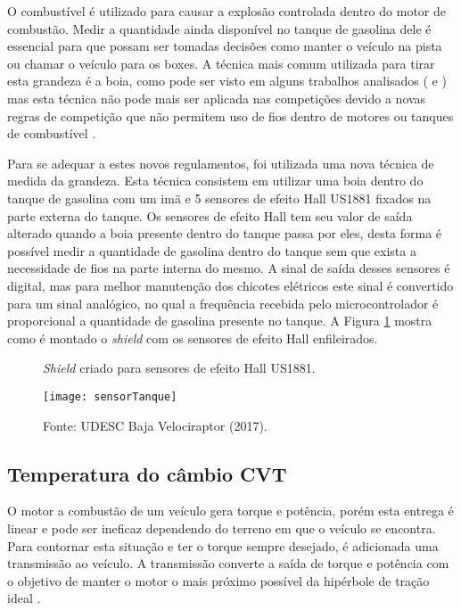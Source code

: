 O combustível é utilizado para causar a explosão controlada dentro do motor de combustão. Medir a quantidade ainda disponível no tanque de gasolina dele é essencial para que possam ser tomadas decisões como manter o veículo na pista ou chamar o veículo para os boxes. A técnica mais comum utilizada para tirar esta grandeza é a boia, como pode ser visto em alguns trabalhos analisados (\cite{Nunes2016} e \cite{projetoMiniBaja2006}) mas esta técnica não pode mais ser aplicada nas competições devido a novas regras de competição que não permitem uso de fios dentro de motores ou tanques de combustível \cite{regulamentobajasae}. 

Para se adequar a estes novos regulamentos, foi utilizada uma nova técnica de medida da grandeza. Esta técnica consistem em utilizar uma boia dentro do tanque de gasolina com um imã e 5 sensores de efeito Hall US1881 fixados na parte externa do tanque. Os sensores de efeito Hall tem seu valor de saída alterado quando a boia presente dentro do tanque passa por eles, desta forma é possível medir a quantidade de gasolina dentro do tanque sem que exista a necessidade de fios na parte interna do mesmo. A sinal de saída desses sensores é digital, mas para melhor manutenção dos chicotes elétricos este sinal é convertido para um sinal analógico, no qual a frequência recebida pelo microcontrolador é proporcional a quantidade de gasolina presente no tanque. A Figura \ref{fig:sensorTanque} mostra como é montado o \textit{shield} com os sensores de efeito Hall enfileirados.  

\begin{figure}[!htb]
	\centering
		\caption{\textit{Shield} criado para sensores de efeito Hall US1881.}
		\texttt{[image: sensorTanque]} 
		\caption*{Fonte: UDESC Baja Velociraptor (2017).}
		\label{fig:sensorTanque}
\end{figure} 


\subsection{Temperatura do câmbio CVT}

O motor a combustão de um veículo gera torque e potência, porém esta entrega é linear e pode ser ineficaz dependendo do terreno em que o veículo se encontra. Para contornar esta situação e ter o torque sempre desejado, é adicionada uma transmissão ao veículo. A transmissão converte a saída de torque e potência com o objetivo de manter o motor o mais próximo possível da hipérbole de tração ideal \cite{Naunheimer2011}. 

